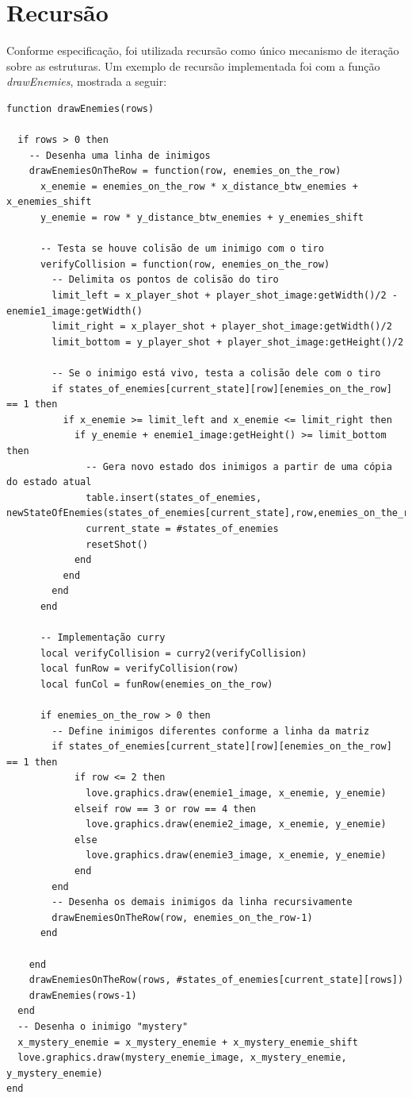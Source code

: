 \documentclass[rel_mlp]{iiufrgs}
\begin{document}
\section{Recursão}

Conforme especificação, foi utilizada recursão como único mecanismo de iteração sobre as estruturas. Um exemplo de recursão implementada foi com a função \textit{drawEnemies}, mostrada a seguir:

\begin{verbatim}
function drawEnemies(rows)

  if rows > 0 then
    -- Desenha uma linha de inimigos
    drawEnemiesOnTheRow = function(row, enemies_on_the_row)
      x_enemie = enemies_on_the_row * x_distance_btw_enemies + x_enemies_shift
      y_enemie = row * y_distance_btw_enemies + y_enemies_shift

      -- Testa se houve colisão de um inimigo com o tiro
      verifyCollision = function(row, enemies_on_the_row)
        -- Delimita os pontos de colisão do tiro
        limit_left = x_player_shot + player_shot_image:getWidth()/2 - enemie1_image:getWidth()
        limit_right = x_player_shot + player_shot_image:getWidth()/2
        limit_bottom = y_player_shot + player_shot_image:getHeight()/2

        -- Se o inimigo está vivo, testa a colisão dele com o tiro
        if states_of_enemies[current_state][row][enemies_on_the_row] == 1 then
          if x_enemie >= limit_left and x_enemie <= limit_right then
            if y_enemie + enemie1_image:getHeight() >= limit_bottom then
              -- Gera novo estado dos inimigos a partir de uma cópia do estado atual
              table.insert(states_of_enemies, newStateOfEnemies(states_of_enemies[current_state],row,enemies_on_the_row))
              current_state = #states_of_enemies
              resetShot()
            end
          end
        end
      end

      -- Implementação curry
      local verifyCollision = curry2(verifyCollision)
      local funRow = verifyCollision(row)
      local funCol = funRow(enemies_on_the_row)

      if enemies_on_the_row > 0 then
        -- Define inimigos diferentes conforme a linha da matriz
        if states_of_enemies[current_state][row][enemies_on_the_row] == 1 then
            if row <= 2 then
              love.graphics.draw(enemie1_image, x_enemie, y_enemie)
            elseif row == 3 or row == 4 then
              love.graphics.draw(enemie2_image, x_enemie, y_enemie)
            else
              love.graphics.draw(enemie3_image, x_enemie, y_enemie)
            end
        end
        -- Desenha os demais inimigos da linha recursivamente
        drawEnemiesOnTheRow(row, enemies_on_the_row-1)
      end

    end
    drawEnemiesOnTheRow(rows, #states_of_enemies[current_state][rows])
    drawEnemies(rows-1)
  end
  -- Desenha o inimigo "mystery"
  x_mystery_enemie = x_mystery_enemie + x_mystery_enemie_shift
  love.graphics.draw(mystery_enemie_image, x_mystery_enemie, y_mystery_enemie)
end
\end{verbatim}
\end{document}
